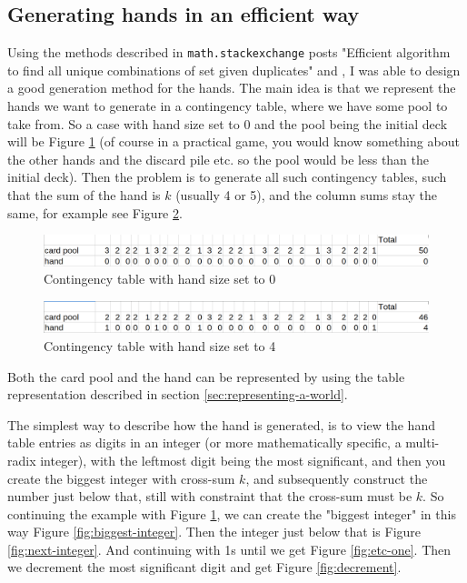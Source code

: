\subsection{Generating hands in an efficient way} \label{sec:efficient-generation-of-hands}
Using the methods described in {\tt math.stackexchange} posts "Efficient algorithm to find all unique combinations of set given duplicates" \cite{HardmathcontigencyTablePost} and \cite{GCabrecursiveGenerationPost}, I was able to design a good generation method for the hands. 
The main idea is that we represent the hands we want to generate in a contingency table, where we have some pool to take from. So a case with hand size set to 0 and the pool being the initial deck will be Figure \ref{fig:hand-pool-table} (of course in a practical game, you would know something about the other hands and the discard pile etc. so the pool would be less than the initial deck). Then the problem is to generate all such contingency tables, such that the sum of the hand is $k$ (usually 4 or 5), and the column sums stay the same, for example see Figure \ref{fig:hand-pool-table-with-hand}.

\begin{figure}
	\centering
\includegraphics[width=13cm,frame]{images/contigency_table.png}
	\caption{Contingency table with hand size set to 0}
	\label{fig:hand-pool-table}
\end{figure}


\begin{figure}
	\centering
\includegraphics[width=13cm,frame]{images/contigency_table_with_hand.png}
	\caption{Contingency table with hand size set to 4}
	\label{fig:hand-pool-table-with-hand}
\end{figure}

Both the card pool and the hand can be represented by using the table representation described in section \ref{sec:representing-a-world}.

The simplest way to describe how the hand is generated, is to view the hand table entries as digits in an integer (or more mathematically specific, a multi-radix integer), with the leftmost digit being the most significant, and then you create the biggest integer with cross-sum $k$, and subsequently construct the number just below that, still with constraint that the cross-sum must be $k$. So continuing the example with Figure \ref{fig:hand-pool-table}, we can create the "biggest integer" in this way Figure \ref{fig:biggest-integer}. Then the integer just below that is Figure \ref{fig:next-integer}. And continuing with 1s until we get Figure \ref{fig:etc-one}.
Then we decrement the most significant digit and get Figure \ref{fig:decrement}.

